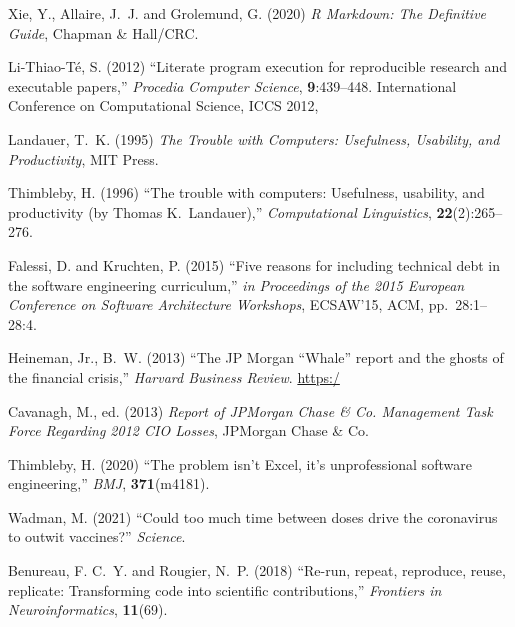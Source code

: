 \documentclass{comjnl}
\begin{document}
{\begin{thebibliography}{100}
{{{
Xie, Y., Allaire, J.~J. and Grolemund, G. (2020) {\em R Markdown: The
  Definitive Guide}, Chapman {\&} Hall/CRC.

Li-Thiao-T{\' e}, S. (2012) ``Literate program execution for reproducible
  research and executable papers,'' {\em Procedia Computer Science},
  \textbf{9}:439--448.
\newblock International Conference on Computational Science, ICCS 2012,

Landauer, T.~K. (1995) {\em The Trouble with Computers: {Usefulness},
  Usability, and Productivity}, MIT Press.

Thimbleby, H. (1996) ``The trouble with computers: {Usefulness}, usability, and
  productivity (by {Thomas} {K.~Landauer}),'' {\em Computational Linguistics},
  \textbf{22}(2):265--276.

Falessi, D. and Kruchten, P. (2015) ``Five reasons for including technical debt
  in the software engineering curriculum,'' {\em in Proceedings of the 2015
  European Conference on Software Architecture Workshops}, ECSAW'15, ACM,
  pp.~28:1--28:4.
\newblock {}

{Heineman, Jr.}, B.~W. (2013) ``The {JP Morgan} ``{Whale}'' report and the
  ghosts of the financial crisis,'' {\em Harvard Business Review}.
\newblock
  \url{https:/}\midurl{/}

Cavanagh, M., ed. (2013) {\em Report of JPMorgan Chase {\&} Co{\@}. Management
  Task Force Regarding 2012 CIO Losses}, JPMorgan Chase {\&} Co{\@}.

Thimbleby, H. (2020) ``The problem isn't {Excel}, it's unprofessional software
  engineering,'' {\em BMJ}, \textbf{371}(m4181).
\newblock {}

Wadman, M. (2021) ``Could too much time between doses drive the coronavirus to
  outwit vaccines?'' {\em Science}.
\newblock {}

Benureau, F. C.~Y. and Rougier, N.~P. (2018) ``Re-run, repeat, reproduce,
  reuse, replicate: {Transforming} code into scientific contributions,'' {\em
  Frontiers in Neuroinformatics}, \textbf{11}(69).
\newblock {}

}}}
\end{thebibliography}}
\end{document}
